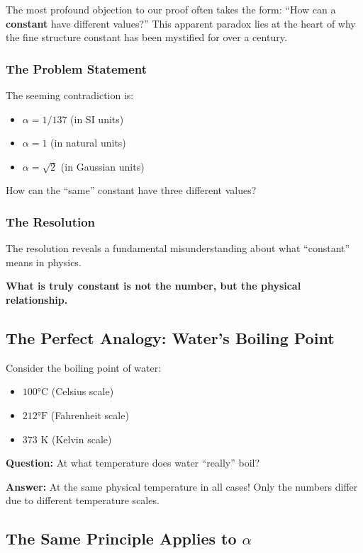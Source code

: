 \documentclass[12pt,a4paper]{article}
\begin{document}
The most profound objection to our proof often takes the form: ``How can a \textbf{constant} have different values?'' This apparent paradox lies at the heart of why the fine structure constant has been mystified for over a century.

\subsubsection{The Problem Statement}

The seeming contradiction is:
\begin{itemize}
	\item $\alpha = 1/137$ (in SI units)
	\item $\alpha = 1$ (in natural units)
	\item $\alpha = \sqrt{2}$ (in Gaussian units)
\end{itemize}

How can the ``same'' constant have three different values?

\subsubsection{The Resolution}

The resolution reveals a fundamental misunderstanding about what ``constant'' means in physics.

\textbf{What is truly constant is not the number, but the physical relationship.}

\subsection{The Perfect Analogy: Water's Boiling Point}

Consider the boiling point of water:
\begin{itemize}
	\item $100°\text{C}$ (Celsius scale)
	\item $212°\text{F}$ (Fahrenheit scale)
	\item $373\text{ K}$ (Kelvin scale)
\end{itemize}

\textbf{Question:} At what temperature does water ``really'' boil?

\textbf{Answer:} At the same physical temperature in all cases! Only the numbers differ due to different temperature scales.

\subsection{The Same Principle Applies to $\alpha$}
\end{document}
